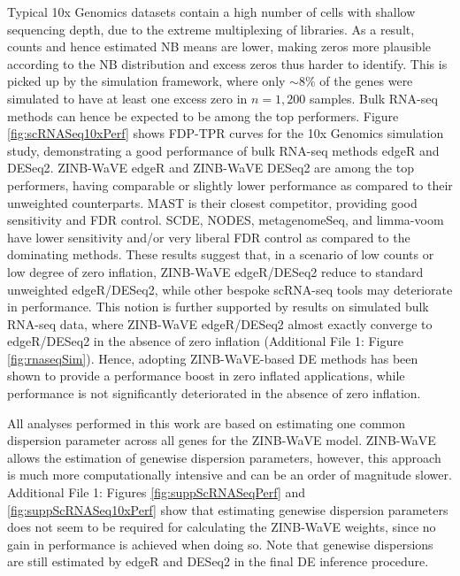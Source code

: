 \documentclass{bmcart}
\newcommand{\RPack}[1]{\textsf{#1}}
\newcommand{\koen}[1]{\textcolor{olive}{*** KVdB: #1}}
\newcommand{\lc}[1]{\textcolor{ao}{*** LC: #1}}
\begin{document}
Typical 10x Genomics datasets contain a high number of cells with shallow sequencing depth, due to the extreme multiplexing of libraries. 
As a result, counts and hence estimated NB means are lower, making zeros more plausible according to the NB distribution and excess zeros thus harder to identify.
This is picked up by the simulation framework, where only $\sim 8\%$ of the genes were simulated to have at least one excess zero in $n=1,200$ samples.
Bulk RNA-seq methods can hence be expected to be among the top performers. 
Figure \ref{fig:scRNASeq10xPerf} shows FDP-TPR curves for the 10x Genomics simulation study, demonstrating a good performance of bulk RNA-seq methods \RPack{edgeR} and \RPack{DESeq2}. 
ZINB-WaVE \RPack{edgeR} and ZINB-WaVE \RPack{DESeq2} are among the top performers, having comparable or slightly lower performance as compared to their unweighted counterparts.
\RPack{MAST} is their closest competitor, providing good sensitivity and FDR control.
\RPack{SCDE}, \RPack{NODES}, \RPack{metagenomeSeq}, and limma-voom have lower sensitivity and/or very liberal FDR control as compared to the dominating methods. 
These results suggest that, in a scenario of low counts or low degree of zero inflation, ZINB-WaVE \RPack{edgeR}/\RPack{DESeq2} reduce to standard unweighted \RPack{edgeR}/\RPack{DESeq2},  %
while other bespoke scRNA-seq tools may deteriorate in performance. 
This notion is further supported by results on simulated bulk RNA-seq data, where ZINB-WaVE \RPack{edgeR}/\RPack{DESeq2} almost exactly converge to \RPack{edgeR}/\RPack{DESeq2} in the absence of zero inflation (Additional File 1: Figure \ref{fig:rnaseqSim}).
Hence, adopting ZINB-WaVE-based DE methods has been shown to provide a performance boost in zero inflated applications, while performance is not significantly deteriorated in the absence of zero inflation.

All analyses performed in this work are based on estimating one common dispersion parameter across all genes for the ZINB-WaVE model. ZINB-WaVE allows the estimation of genewise dispersion parameters, however, this approach is much more computationally intensive and can be an order of magnitude slower. Additional File 1: Figures \ref{fig:suppScRNASeqPerf} and \ref{fig:suppScRNASeq10xPerf} show that estimating genewise dispersion parameters does not seem to be required for calculating the ZINB-WaVE weights, since no gain in performance is achieved when doing so. Note that genewise dispersions are still estimated by \RPack{edgeR} and \RPack{DESeq2} in the final DE inference procedure.
\end{document}
